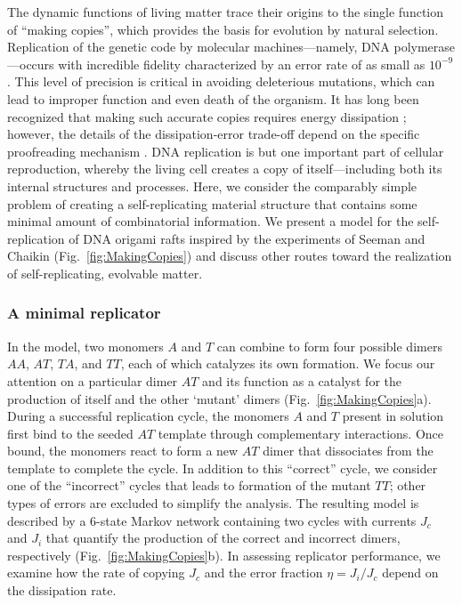 \begin{appendices}
The dynamic functions of living matter trace their origins to the single function of ``making copies'', which provides the basis for evolution by natural selection.  Replication of the genetic code by molecular machines---namely, DNA polymerase---occurs with incredible fidelity characterized by an error rate of as small as $10^{-9}$ \autocite{McCulloch2008}. This level of precision is critical in avoiding deleterious mutations, which can lead to improper function and even death of the organism. It has long been recognized that making such accurate copies requires energy dissipation \autocite{Bennett1979}; however, the details of the dissipation-error trade-off depend on the specific proofreading mechanism \autocite{Sartori2013}. DNA replication is but one important part of cellular reproduction, whereby the living cell creates a copy of itself---including both its internal structures and processes.  Here, we consider the comparably simple problem of creating a self-replicating material structure that contains some minimal amount of combinatorial information. We present a model for the self-replication of DNA origami rafts inspired by the experiments of Seeman and Chaikin \autocite{He2017} (Fig.~\ref{fig:MakingCopies}) and discuss other routes toward the realization of self-replicating, evolvable matter.

\subsubsection{A minimal replicator}

In the model, two monomers $A$ and $T$ can combine to form four possible dimers $AA$, $AT$, $TA$, and $TT$, each of which catalyzes its own formation.  We focus our attention on a particular dimer $AT$ and its function as a catalyst for the production of itself and the other `mutant' dimers (Fig.~\ref{fig:MakingCopies}a). During a successful replication cycle, the monomers $A$ and $T$ present in solution first bind to the seeded $AT$ template through complementary interactions.  Once bound, the monomers react to form a new $AT$ dimer that dissociates from the template to complete the cycle.  In addition to this ``correct'' cycle, we consider one of the ``incorrect'' cycles that leads to formation of the mutant $TT$; other types of errors are excluded to simplify the analysis.  The resulting model is described by a 6-state Markov network containing two cycles with currents $J_c$ and $J_i$ that quantify the production of the correct and incorrect dimers, respectively (Fig.~\ref{fig:MakingCopies}b).  In assessing replicator performance, we examine how the rate of copying $J_c$ and the error fraction $\eta = J_i/J_c$  depend on the dissipation rate. 


\end{appendices}
